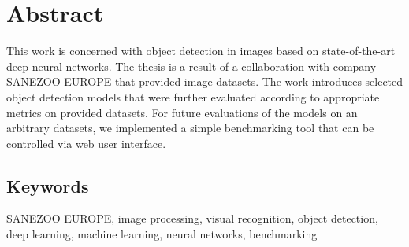 \chapter*{Abstract}
\noindent
This work is concerned with object detection in images based on state-of-the-art
deep neural networks. The thesis is a result of a collaboration with
company SANEZOO EUROPE that provided image datasets. The work introduces
selected object detection models that were further evaluated according to
appropriate metrics on provided datasets. For future evaluations of the models
on an arbitrary datasets, we implemented a simple benchmarking tool that
can be controlled via web user interface.

\section*{Keywords}
\noindent
SANEZOO EUROPE, image processing, visual recognition, object detection, deep
learning, machine learning, neural networks, benchmarking
